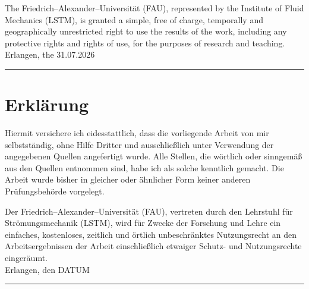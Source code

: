 \documentclass[
 	11pt,                 				%
  	notitlepage,          				%
  	twoside, 			   				%
 	bibliography=totoc,
  	listof=totoc,
  	headsepline,         				%
  	footsepline,         				%
  cleardoublepage=empty,				%
  numbers=noenddot,
]{scrreprt}
\begin{document}
The Friedrich--Alexander--Universität (FAU), represented by the Institute of Fluid Mechanics (LSTM), is granted a simple, free of charge, temporally and geographically unrestricted right to use the results of the work, including any protective rights and rights of use, for the purposes of research and teaching.
\\ [35mm]
Erlangen, the 31.07.2026 \hspace{4cm} \rule{5cm}{0.02mm}
\else
\chapter*{Erklärung}

Hiermit versichere ich eidesstattlich, dass die vorliegende Arbeit von mir selbstständig, ohne Hilfe Dritter und ausschließlich unter Verwendung der angegebenen Quellen angefertigt wurde. Alle Stellen, die wörtlich oder sinngemäß aus den Quellen entnommen sind, habe ich als solche kenntlich gemacht. Die Arbeit wurde bisher in gleicher oder ähnlicher Form keiner anderen Prüfungsbehörde vorgelegt.

Der Friedrich--Alexander--Universität (FAU), vertreten durch den Lehrstuhl für Strömungsmechanik (LSTM), wird für Zwecke der Forschung und Lehre ein einfaches, kostenloses, zeitlich und örtlich unbeschränktes Nutzungsrecht an den Arbeitsergebnissen der Arbeit einschließlich etwaiger Schutz- und Nutzungsrechte eingeräumt.
\\ [35mm]
Erlangen, den DATUM \hspace{4cm} \rule{5cm}{0.02mm}
\fi	


\thispagestyle{empty}
\cleardoublepage



\thispagestyle{empty}
\cleardoublepage



\cleardoublepage
{}
\thispagestyle{empty}
\cleardoublepage
\pagestyle{plain}




\pagestyle{headings}

\ifenglish
{}
\else
{}
\fi
\end{document}
